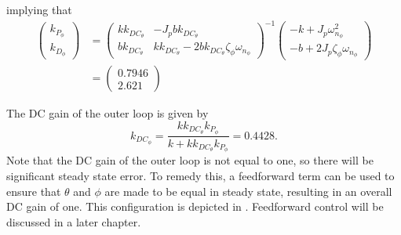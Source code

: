 implying that
\begin{align*}
\begin{pmatrix}k_{P_\phi}\\k_{D_\phi}\end{pmatrix} &= \begin{pmatrix} kk_{DC_\theta} & -J_pbk_{DC_\theta} \\ bk_{DC_\theta} & kk_{DC_\theta}-2bk_{DC_\theta}\zeta_\phi\omega_{n_\phi} \end{pmatrix}^{-1} 
	\begin{pmatrix} -k + J_p\omega_{n_\phi}^2 \\ -b + 2J_p\zeta_\phi\omega_{n_\phi} \end{pmatrix} \\
	&= \begin{pmatrix} 0.7946 \\ 2.621 \end{pmatrix}
\end{align*}

The DC gain of the outer loop is given by
\[
k_{DC_{\phi}} = \frac{kk_{DC_\theta}k_{P_\phi}}{k+kk_{DC_\theta}k_{P_\phi}} = 0.4428.
\]
Note that the DC gain of the outer loop is not equal to one, so there will be significant steady state error. To remedy this, a feedforward term can be used to ensure that $\theta$ and $\phi$ are made to be equal in steady state, resulting in an overall DC gain of one. This configuration is depicted in . Feedforward control will be discussed in a later chapter.

